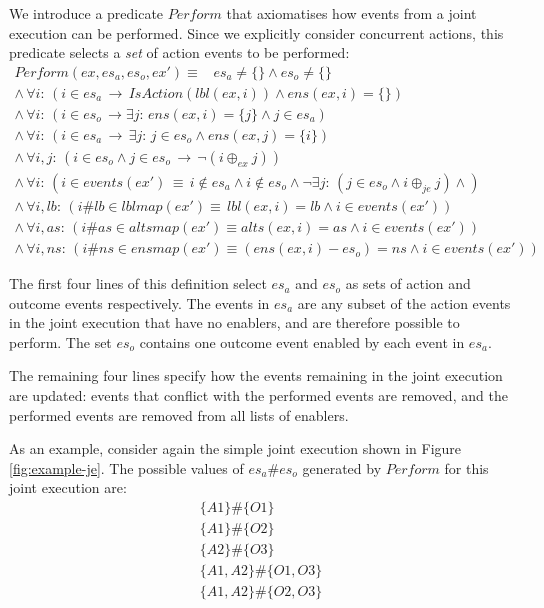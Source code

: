We introduce a predicate $Perform$ that axiomatises how events from
a joint execution can be performed. Since we explicitly consider concurrent
actions, this predicate selects a \emph{set} of action events to be
performed: \begin{gather*}
Perform(ex,es_{a},es_{o},ex')\equiv\,\,\,\,\, es_{a}\neq\{\}\wedge es_{o}\neq\{\}\\
\wedge\,\forall i:\,\left(i\in es_{a}\,\rightarrow\, IsAction(lbl(ex,i))\wedge ens(ex,i)=\{\}\right)\\
\wedge\,\forall i:\,\left(i\in es_{o}\,\rightarrow\exists j:\, ens(ex,i)=\{j\}\wedge j\in es_{a}\right)\\
\wedge\,\forall i:\,\left(i\in es_{a}\,\rightarrow\,\exists j:\, j\in es_{o}\wedge ens(ex,j)=\{i\}\right)\\
\wedge\,\forall i,j:\,\left(i\in es_{o}\wedge j\in es_{o}\,\rightarrow\,\neg(i\oplus_{ex}j)\right)\\
\wedge\,\forall i:\,\left(i\in events(ex')\,\equiv\, i\not\in es_{a}\wedge i\not\in es_{o}\wedge\neg\exists j:\,(j\in es_{o}\wedge i\oplus_{je}j)\wedge\right)\\
\wedge\,\forall i,lb:\,\left(i\#lb\in lblmap(ex')\equiv\, lbl(ex,i)=lb\wedge i\in events(ex')\right)\\
\wedge\,\forall i,as:\,\left(i\#as\in altsmap(ex')\equiv alts(ex,i)=as\wedge i\in events(ex')\right)\\
\wedge\,\forall i,ns:\,\left(i\#ns\in ensmap(ex')\equiv(ens(ex,i)-es_{o})=ns\wedge i\in events(ex')\right)\end{gather*}


The first four lines of this definition select $es_{a}$ and $es_{o}$
as sets of action and outcome events respectively. The events in $es_{a}$
are any subset of the action events in the joint execution that have
no enablers, and are therefore possible to perform. The set $es_{o}$
contains one outcome event enabled by each event in $es_{a}$.

The remaining four lines specify how the events remaining in the joint
execution are updated: events that conflict with the performed events
are removed, and the performed events are removed from all lists of
enablers.

As an example, consider again the simple joint execution shown in
Figure \ref{fig:example-je}. The possible values of $es_{a}\#es_{o}$
generated by $Perform$ for this joint execution are:\begin{gather*}
\{A1\}\#\{O1\}\\
\{A1\}\#\{O2\}\\
\{A2\}\#\{O3\}\\
\{A1,A2\}\#\{O1,O3\}\\
\{A1,A2\}\#\{O2,O3\}\end{gather*}



